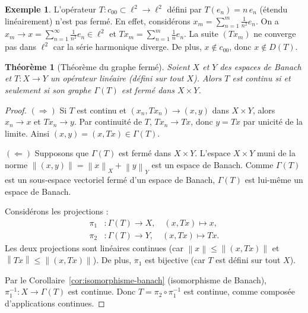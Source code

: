 \documentclass[a4paper,12pt]{book}
\newcommand{\norm}[1]{\left\| #1 \right\|}
\theoremstyle{definition}
\newtheorem{exemple}[definition]{Exemple}
\theoremstyle{plain}
\newtheorem{theoreme}[definition]{Théorème}
\theoremstyle{remark}
\begin{document}
\begin{exemple}
\label{ex:operateur-non-ferme}
L'opérateur $T : c_{00} \subset \ell^2 \to \ell^2$ défini par
$T(e_n) = n\, e_n$ (étendu linéairement) n'est pas fermé. En effet,
considérons $x_m = \sum_{n=1}^{m} \frac{1}{n^2} e_n$. On a $x_m \to x = \sum_{n=1}^{\infty} \frac{1}{n^2} e_n \in \ell^2$
et $Tx_m = \sum_{n=1}^{m} \frac{1}{n} e_n$. La suite $(Tx_m)$ ne converge pas dans $\ell^2$
car la série harmonique diverge. De plus, $x \notin c_{00}$, donc $x \notin D(T)$.
\end{exemple}

\begin{theoreme}[Théorème du graphe fermé]
\label{thm:graphe-ferme}
Soient $X$ et $Y$ des espaces de Banach et $T : X \to Y$ un opérateur linéaire
(défini sur tout $X$). Alors $T$ est continu si et seulement si son graphe
$\Gamma(T)$ est fermé dans $X \times Y$.
\end{theoreme}

\begin{proof}
$(\Rightarrow)$ Si $T$ est continu et $(x_n, Tx_n) \to (x,y)$ dans $X \times Y$,
alors $x_n \to x$ et $Tx_n \to y$. Par continuité de $T$, $Tx_n \to Tx$, donc
$y = Tx$ par unicité de la limite. Ainsi $(x,y) = (x,Tx) \in \Gamma(T)$.

$(\Leftarrow)$ Supposons que $\Gamma(T)$ est fermé dans $X \times Y$.
L'espace $X \times Y$ muni de la norme $\norm{(x,y)} = \norm{x}_X + \norm{y}_Y$
est un espace de Banach. Comme $\Gamma(T)$ est
un sous-espace vectoriel fermé d'un espace de Banach, $\Gamma(T)$ est lui-même
un espace de Banach.

Considérons les projections :
\begin{align*}
  \pi_1 &: \Gamma(T) \to X, \quad (x, Tx) \mapsto x, \\
  \pi_2 &: \Gamma(T) \to Y, \quad (x, Tx) \mapsto Tx.
\end{align*}
Les deux projections sont linéaires continues (car $\norm{x} \leq \norm{(x,Tx)}$
et $\norm{Tx} \leq \norm{(x,Tx)}$). De plus, $\pi_1$ est bijective
(car $T$ est défini sur tout $X$).

Par le Corollaire~\ref{cor:isomorphisme-banach} (isomorphisme de Banach),
$\pi_1^{-1} : X \to \Gamma(T)$ est continue. Donc $T = \pi_2 \circ \pi_1^{-1}$
est continue, comme composée d'applications continues.
\end{proof}
\end{document}
